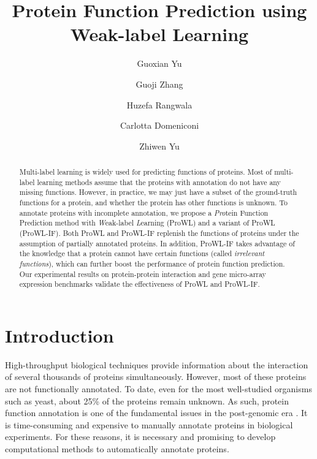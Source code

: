 \documentclass{llncs} %
\begin{document}
\title{Protein Function Prediction using Weak-label Learning}
\author
{Guoxian Yu\and Guoji Zhang \and
 Huzefa Rangwala \and Carlotta Domeniconi \and Zhiwen Yu
}
\maketitle
\begin{abstract}
Multi-label learning is widely used for predicting functions of proteins. Most of
multi-label learning methods assume that the proteins with annotation do
not have any missing  functions. However, in practice, we may just have a
subset of the ground-truth functions for a protein, and whether the protein has other functions is unknown. To annotate proteins with incomplete annotation, we propose a \textit{Pro}tein Function Prediction  method with \textit{W}eak-label \textit{L}earning (ProWL) and a variant of ProWL (ProWL-IF). Both ProWL and ProWL-IF replenish the functions of proteins under the assumption of partially annotated proteins. In addition, ProWL-IF takes advantage of the knowledge that a protein cannot have certain functions (called \textit{irrelevant functions}), which can further boost the performance of protein function prediction. Our experimental results on protein-protein interaction and gene micro-array expression benchmarks validate the effectiveness of ProWL and ProWL-IF.
\end{abstract}

\section{Introduction}
\label{introduction}
High-throughput biological techniques provide information about the interaction of several thousands of proteins simultaneously. However, most of these proteins are not functionally annotated. To date, even for the most well-studied organisms such as yeast, about 25\% of the proteins remain unknown. As such, protein function annotation is one of the fundamental issues in the post-genomic era \cite{sharan2007network}. It is time-consuming and expensive to manually annotate proteins in biological experiments. For these reasons, it is necessary and promising to develop computational methods to automatically annotate proteins.
\end{document}
